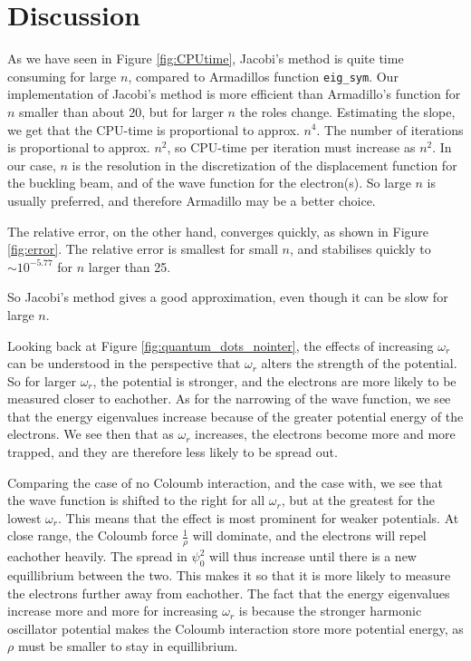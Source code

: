\section{Discussion}
\label{sec:discussion}

As we have seen in Figure \ref{fig:CPUtime}, Jacobi's method is quite time consuming for large $n$, compared to Armadillos function \texttt{eig\_sym}.  Our implementation of Jacobi's method is more efficient than Armadillo's function for $n$ smaller than about 20, but for larger $n$ the roles change. Estimating the slope, we get that the CPU-time is proportional to approx. $n^4$. The number of iterations is proportional to approx. $n^2$, so CPU-time per iteration must increase as $n^2$. In our case, $n$ is the resolution in the discretization of the displacement function for the buckling beam, and of the wave function for the electron(s). So large $n$ is usually preferred, and therefore Armadillo may be a better choice.

The relative error, on the other hand, converges quickly, as shown in Figure \ref{fig:error}. The relative error is smallest for small $n$, and stabilises quickly to $\sim10^{-5.77}$ for $n$ larger than 25.

So Jacobi's method gives a good approximation, even though it can be slow for large $n$.

Looking back at Figure \ref{fig:quantum_dots_nointer}, the effects of increasing
$\omega_r$ can be understood in the perspective that $\omega_r$ alters the strength
of the potential. So for larger $\omega_r$, the potential is stronger, and the electrons are more likely to be measured
closer to eachother. As for the narrowing of the wave function,
we see that the energy eigenvalues increase because of the greater potential energy
of the electrons. We see then that as $\omega_r$ increases, the electrons become
more and more trapped, and they are therefore less likely to be spread out.

Comparing the case of no Coloumb interaction, and the case with, we see that
the wave function is shifted to the right for all $\omega_r$, but at the greatest
for the lowest $\omega_r$. This means that the effect is most prominent for weaker
potentials. At close range, the Coloumb force $\frac{1}{\rho}$ will dominate,
and the electrons will repel eachother heavily. The spread in $\psi_0^2$ will thus increase
until there is a new equillibrium between the two. This makes it so that it is more likely to
measure the electrons further away from eachother. The fact that the energy eigenvalues
increase more and more for increasing $\omega_r$ is because the stronger harmonic oscillator
potential makes the Coloumb interaction store more potential energy, as $\rho$ must be smaller
to stay in equillibrium.

